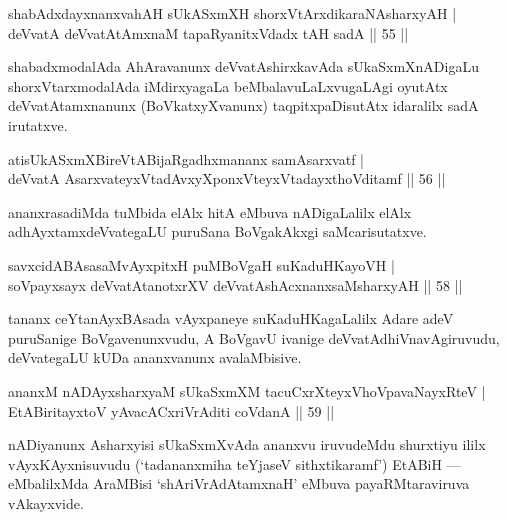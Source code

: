 \begin{shl}
shabAdxdayxnanxvahAH sUkASxmXH shorxVtArxdikaraNAsharxyAH |\\
deVvatA deVvatAtAmxnaM tapaRyanitxVdadx tAH sadA \hfill || 55 || 
\end{shl}

\begin{artha}
shabadxmodalAda AhAravanunx deVvatAshirxkavAda sUkaSxmXnADigaLu shorxVtarxmodalAda iMdirxyagaLa beMbalavuLaLxvugaLAgi oyutAtx deVvatAtamxnanunx (BoVkatxyXvanunx) taqpitxpaDisutAtx idaralilx sadA irutatxve.
\end{artha}

\begin{shl}
atisUkASxmXBireVtABijaRgadhxmananx samAsarxvatf |\\
deVvatA AsarxvateyxVtadAvxyXponxVteyxVtadayxthoVditamf \hfill || 56 || 
\end{shl}

\begin{artha}
ananxrasadiMda tuMbida elAlx hitA eMbuva nADigaLalilx elAlx adhAyxtamxdeVvategaLU puruSana BoVgakAkxgi saMcarisutatxve.
\end{artha}


\begin{shl}
savxcidABAsasaMvAyxpitxH puMBoVgaH suKaduHKayoVH |\\
soV\s payxsayx deVvatAtanotxrXV deVvatAshAcxnanxsaMsharxyAH \hfill || 58 || 
\end{shl}

\begin{artha}
tananx ceYtanAyxBAsada vAyxpaneye suKaduHKagaLalilx Adare adeV puruSanige BoVgavenunxvudu, A BoVgavU ivanige deVvatAdhiVnavAgiruvudu, deVvategaLU kUDa ananxvanunx avalaMbisive.
\end{artha}

\begin{shl}
ananxM nADAyxsharxyaM sUkaSxmXM tacuCxrXteyxVhoVpavaNayxRteV |\\
EtABiritayxtoV yAvacACxriVrAditi coVdanA \hfill || 59 || 
\end{shl}

\begin{artha}
nADiyanunx Asharxyisi sUkaSxmXvAda ananxvu iruvudeMdu shurxtiyu ililx vAyxKAyxnisuvudu (`tadananxmiha teYjaseV sithxtikaramf') EtABiH --- eMbalilxMda AraMBisi `shAriVrAdAtamxnaH' eMbuva payaRMtaraviruva vAkayxvide.
\end{artha}

